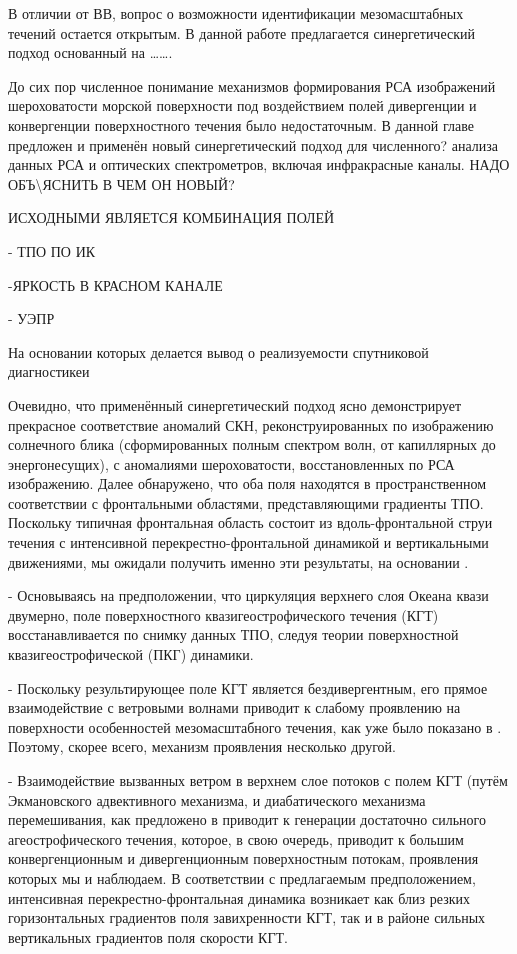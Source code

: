 В отличии от ВВ, вопрос о возможности идентификации мезомасштабных течений остается открытым. В данной работе предлагается синергетический подход основанный на \dots \dots .

 

До сих пор численное понимание механизмов формирования РСА изображений шероховатости морской поверхности под воздействием полей дивергенции и конвергенции поверхностного течения было недостаточным. В данной главе предложен и применён новый синергетический подход для численного? анализа данных РСА и оптических спектрометров, включая инфракрасные каналы. НАДО ОБЪ\textbackslash ЯСНИТЬ В ЧЕМ ОН НОВЫЙ?

ИСХОДНЫМИ ЯВЛЯЕТСЯ КОМБИНАЦИЯ ПОЛЕЙ

- ТПО ПО ИК

-ЯРКОСТЬ В КРАСНОМ КАНАЛЕ

- УЭПР 



На основании которых делается вывод о реализуемости спутниковой диагностикеи 

Очевидно, что применённый синергетический подход ясно демонстрирует прекрасное соответствие аномалий СКН, реконструированных по изображению солнечного блика (сформированных полным спектром волн, от капиллярных до энергонесущих), с аномалиями шероховатости, восстановленных по РСА изображению. Далее обнаружено, что оба поля находятся в пространственном соответствии с фронтальными областями, представляющими градиенты ТПО. Поскольку типичная фронтальная область состоит из вдоль-фронтальной струи течения с интенсивной перекрестно-фронтальной динамикой и вертикальными движениями, мы ожидали получить именно эти результаты, на основании \citep{Kudryavtsev2005,Johannessen2005}.

- Основываясь на предположении, что циркуляция верхнего слоя Океана квази двумерно, поле поверхностного квазигеострофического течения (КГТ) восстанавливается по снимку данных ТПО, следуя теории поверхностной квазигеострофической (ПКГ) динамики. 

- Поскольку результирующее поле КГТ является бездивергентным, его прямое взаимодействие с ветровыми волнами приводит к слабому проявлению на поверхности особенностей мезомасштабного течения, как уже было показано в \citep{Kudryavtsev2005,Johannessen2005}. Поэтому, скорее всего, механизм проявления несколько другой. 

- Взаимодействие вызванных ветром в верхнем слое потоков с полем КГТ (путём Экмановского адвективного механизма, и диабатического механизма перемешивания, как предложено в \citep{Klein1990,Garrett1981}  приводит к генерации достаточно сильного агеострофического течения, которое, в свою очередь, приводит к большим конвергенционным и дивергенционным поверхностным потокам, проявления которых мы и наблюдаем. В соответствии с предлагаемым предположением, интенсивная перекрестно-фронтальная динамика возникает как близ резких горизонтальных градиентов поля завихренности КГТ, так и в районе сильных вертикальных градиентов поля скорости КГТ.

